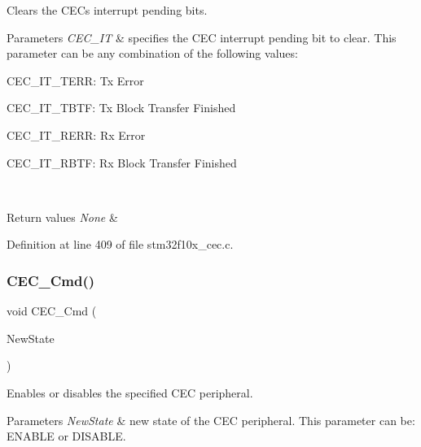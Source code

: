 Clears the C\+EC\textquotesingle{}s interrupt pending bits. 


\begin{DoxyParams}{Parameters}
{\em C\+E\+C\+\_\+\+IT} & specifies the C\+EC interrupt pending bit to clear. This parameter can be any combination of the following values\+: \begin{DoxyItemize}
\item C\+E\+C\+\_\+\+I\+T\+\_\+\+T\+E\+RR\+: Tx Error \item C\+E\+C\+\_\+\+I\+T\+\_\+\+T\+B\+TF\+: Tx Block Transfer Finished \item C\+E\+C\+\_\+\+I\+T\+\_\+\+R\+E\+RR\+: Rx Error \item C\+E\+C\+\_\+\+I\+T\+\_\+\+R\+B\+TF\+: Rx Block Transfer Finished \end{DoxyItemize}
\\
\hline
\end{DoxyParams}

\begin{DoxyRetVals}{Return values}
{\em None} & \\
\hline
\end{DoxyRetVals}


Definition at line 409 of file stm32f10x\+\_\+cec.\+c.

\mbox{\label{group___c_e_c___private___functions_ga0c8efa79e5768930e567b3b3ed6e09e9}} 
\subsubsection{\texorpdfstring{C\+E\+C\+\_\+\+Cmd()}{CEC\_Cmd()}}
{\footnotesize\ttfamily void C\+E\+C\+\_\+\+Cmd (\begin{DoxyParamCaption}\item[{\hyperlink{group___exported__types_gac9a7e9a35d2513ec15c3b537aaa4fba1}{Functional\+State}}]{New\+State }\end{DoxyParamCaption})}



Enables or disables the specified C\+EC peripheral. 


\begin{DoxyParams}{Parameters}
{\em New\+State} & new state of the C\+EC peripheral. This parameter can be\+: E\+N\+A\+B\+LE or D\+I\+S\+A\+B\+LE. \\
\hline
\end{DoxyParams}

